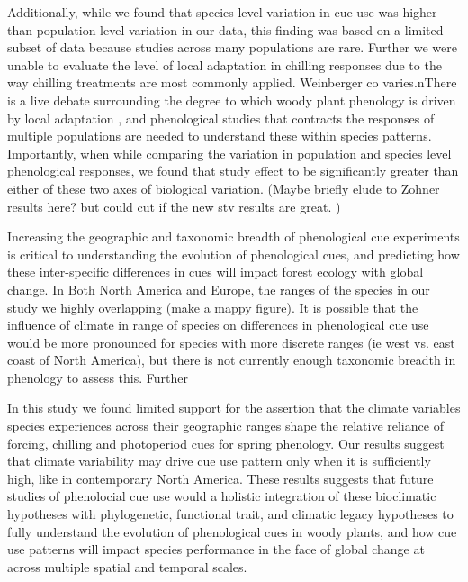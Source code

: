 \documentclass[12pt]{article}\usepackage[]{graphicx}\usepackage[]{color}
\begin{document}
\noindent Additionally, while we found that species level variation in cue use was higher than population level variation in our data, this finding was based on a limited subset of data because studies across many populations are rare. Further we were unable to evaluate the level of local adaptation in chilling responses due to the way chilling treatments are most commonly applied. Weinberger co varies.nThere is a live debate surrounding the degree to which woody plant phenology is driven by local adaptation \citep{}, and phenological studies that contracts the responses of multiple populations are needed to understand these within species patterns. Importantly, when while comparing the variation in population and species level phenological responses, we found that  study effect to be significantly greater than either of these two axes of biological variation. (Maybe briefly elude to Zohner results here? but could cut if the new stv results are great. )

Increasing the geographic and taxonomic breadth of phenological cue experiments is critical to understanding the evolution of phenological cues, and predicting how these inter-specific differences in cues will impact forest ecology with global change. In Both North America and Europe, the ranges of the species in our study we highly overlapping (make a mappy figure). It is possible that the influence of climate in range of species on differences in phenological cue use would be more pronounced for species with more discrete ranges (ie west vs. east coast of North America), but there is not currently enough taxonomic breadth in phenology to assess this. Further

In this study we found limited support for the assertion that the climate variables species experiences across their geographic ranges shape the relative reliance of forcing, chilling and photoperiod cues for spring phenology. Our results suggest that climate variability may drive cue use pattern only when it is sufficiently high, like in contemporary North America. These results suggests that future studies of phenolocial cue use would a holistic integration of these bioclimatic hypotheses with phylogenetic, functional trait, and climatic legacy hypotheses to fully understand the evolution of phenological cues in woody plants, and how cue use patterns will impact species performance in the face of global change at across multiple spatial and temporal scales.
\end{document}
